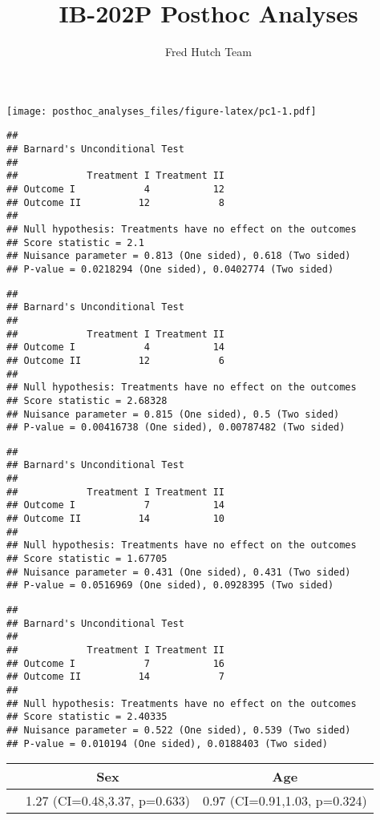 \documentclass[
]{article}
\title{IB-202P Posthoc Analyses}
\author{Fred Hutch Team}
\date{}
\begin{document}
\maketitle

\texttt{[image: posthoc\_analyses\_files/figure-latex/pc1-1.pdf]}

\begin{verbatim}
## 
## Barnard's Unconditional Test
## 
##            Treatment I Treatment II
## Outcome I            4           12
## Outcome II          12            8
## 
## Null hypothesis: Treatments have no effect on the outcomes
## Score statistic = 2.1
## Nuisance parameter = 0.813 (One sided), 0.618 (Two sided)
## P-value = 0.0218294 (One sided), 0.0402774 (Two sided)
\end{verbatim}

\begin{verbatim}
## 
## Barnard's Unconditional Test
## 
##            Treatment I Treatment II
## Outcome I            4           14
## Outcome II          12            6
## 
## Null hypothesis: Treatments have no effect on the outcomes
## Score statistic = 2.68328
## Nuisance parameter = 0.815 (One sided), 0.5 (Two sided)
## P-value = 0.00416738 (One sided), 0.00787482 (Two sided)
\end{verbatim}

\begin{verbatim}
## 
## Barnard's Unconditional Test
## 
##            Treatment I Treatment II
## Outcome I            7           14
## Outcome II          14           10
## 
## Null hypothesis: Treatments have no effect on the outcomes
## Score statistic = 1.67705
## Nuisance parameter = 0.431 (One sided), 0.431 (Two sided)
## P-value = 0.0516969 (One sided), 0.0928395 (Two sided)
\end{verbatim}

\begin{verbatim}
## 
## Barnard's Unconditional Test
## 
##            Treatment I Treatment II
## Outcome I            7           16
## Outcome II          14            7
## 
## Null hypothesis: Treatments have no effect on the outcomes
## Score statistic = 2.40335
## Nuisance parameter = 0.522 (One sided), 0.539 (Two sided)
## P-value = 0.010194 (One sided), 0.0188403 (Two sided)
\end{verbatim}

\begin{tabular}{l|c|c}
\hline
  & Sex & Age\\
\hline
 & 1.27 (CI=0.48,3.37, p=0.633) & 0.97 (CI=0.91,1.03, p=0.324)\\
\hline
\end{tabular}
\end{document}
